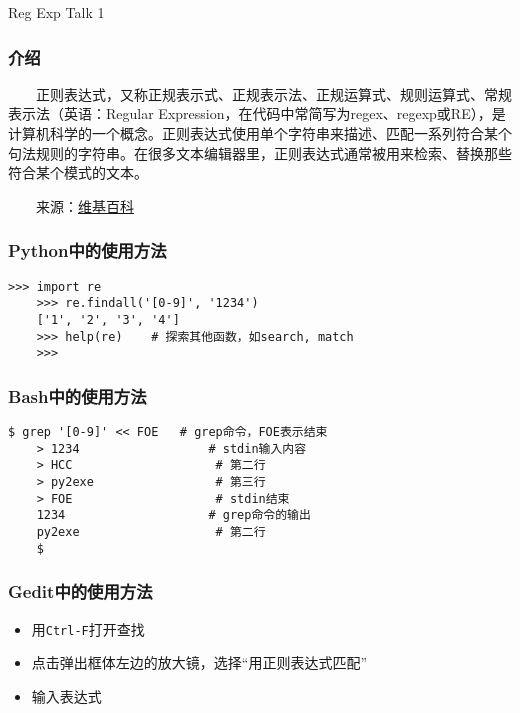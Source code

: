 


\begin{CJK}{UTF8}{gbsn}

\PreFirstFrame
\begin{frame} [fragile]
	\centerline{\fontsize{42}{42}\selectfont Reg Exp Talk 1}
\end{frame}
\PostFirstFrame

\begin{frame} [fragile]
	\frametitle{介绍}
	\linespread{1.5}
	　　正则表达式，又称正规表示式、正规表示法、正规运算式、规则运算式、常规表示法（英语：Regular Expression，在代码中常简写为regex、regexp或RE），是计算机科学的一个概念。正则表达式使用单个字符串来描述、匹配一系列符合某个句法规则的字符串。在很多文本编辑器里，正则表达式通常被用来检索、替换那些符合某个模式的文本。
	
	　　来源：\href{https://zh.wikipedia.org/wiki/\%E6\%AD\%A3\%E5\%88\%99\%E8\%A1\%A8\%E8\%BE\%BE\%E5\%BC\%8F}{维基百科}
\end{frame}

\begin{frame} [fragile]
	\frametitle{Python中的使用方法}
	\linespread{1.5}
	\begin{lstlisting}[style=pythonstyle, gobble=4, texcl]
	>>> import re
	>>> re.findall('[0-9]', '1234')
	['1', '2', '3', '4']
	>>> help(re)	# 探索其他函数，如search, match
	>>>
	\end{lstlisting}
\end{frame}

\begin{frame} [fragile]
	\frametitle{Bash中的使用方法}
	\linespread{1.5}
	\begin{lstlisting}[style=bashstyle, gobble=4, texcl]
	$ grep '[0-9]' << FOE	# grep命令，FOE表示结束
	> 1234					# stdin输入内容
	> HCC					 # 第二行
	> py2exe				 # 第三行
	> FOE					 # stdin结束
	1234					# grep命令的输出
	py2exe					 # 第二行
	$
	\end{lstlisting}
\end{frame}

\begin{frame} [fragile]
	\frametitle{Gedit中的使用方法}
	\linespread{1.5}
	\begin{itemize}
	\item 用\texttt{Ctrl-F}打开查找
	\item 点击弹出框体左边的放大镜，选择``用正则表达式匹配''
	\item 输入表达式
	\end{itemize}
\end{frame}


\end{CJK}
